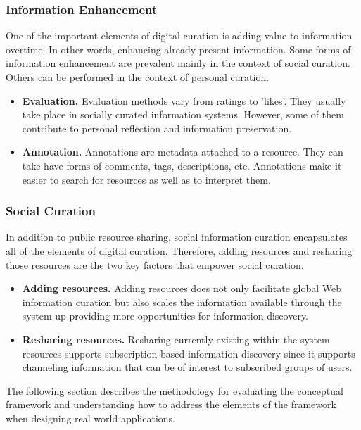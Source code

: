 \documentclass{casconpaper}
\begin{document}
{\subsubsection{Information Enhancement}
One of the important elements of digital curation is adding value to information overtime. In other words, enhancing already present information. Some forms of information enhancement are prevalent mainly in the context of social curation. Others can be performed in the context of personal curation. 
\begin{itemize}
  \item \textbf{Evaluation.} Evaluation methods vary from ratings to 'likes'. They usually take place in socially curated information systems. However, some of them contribute to personal reflection and information preservation. 
  \item \textbf{Annotation.} Annotations are metadata attached to a resource. They can take have forms of comments, tags, descriptions, etc. Annotations make it easier to search for resources as well as to interpret them. 
 
\end{itemize}
} %

{\subsubsection{Social Curation}
In addition to public resource sharing, social information curation encapsulates all of the elements of digital curation. Therefore, adding resources and resharing those resources are the two key factors that empower social curation.
\begin{itemize}
  \item \textbf{Adding resources.} Adding resources does not only facilitate global Web information curation but also scales the information available through the system up providing more opportunities for information discovery.
  \item \textbf{Resharing resources.} Resharing currently existing within the system resources supports subscription-based information discovery since it supports channeling information that can be of interest to subscribed groups of users. 
 
\end{itemize}
} %

The following section describes the methodology for evaluating the conceptual framework and understanding how to address the elements of the framework when designing real world applications.
\end{document}
